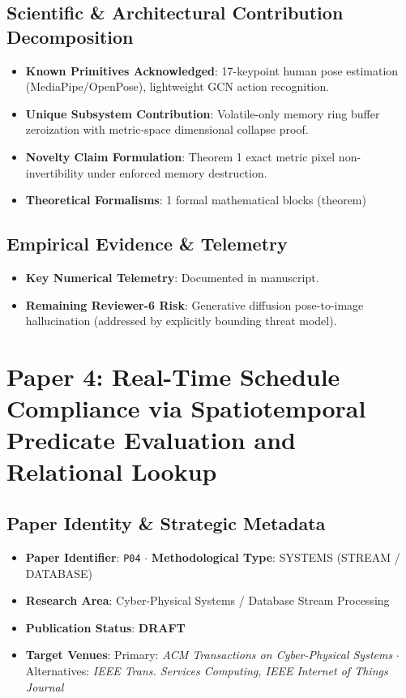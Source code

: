 \documentclass[11pt,a4paper]{article}
\begin{document}
\subsection*{Scientific & Architectural Contribution Decomposition}
\begin{itemize}[leftmargin=1.5em, itemsep=0.2em]
    \item \textbf{Known Primitives Acknowledged}: 17-keypoint human pose estimation (MediaPipe/OpenPose), lightweight GCN action recognition.
    \item \textbf{Unique Subsystem Contribution}: Volatile-only memory ring buffer zeroization with metric-space dimensional collapse proof.
    \item \textbf{Novelty Claim Formulation}: Theorem 1 exact metric pixel non-invertibility under enforced memory destruction.
    \item \textbf{Theoretical Formalisms}: 1 formal mathematical blocks (theorem)
\end{itemize}

\subsection*{Empirical Evidence & Telemetry}
\begin{itemize}[leftmargin=1.5em, itemsep=0.2em]
    \item \textbf{Key Numerical Telemetry}: Documented in manuscript.
    \item \textbf{Remaining Reviewer-6 Risk}: Generative diffusion pose-to-image hallucination (addressed by explicitly bounding threat model).
\end{itemize}

\section{Paper 4: Real-Time Schedule Compliance via Spatiotemporal Predicate Evaluation and Relational Lookup}

\subsection*{Paper Identity \& Strategic Metadata}
\begin{itemize}[leftmargin=1.5em, itemsep=0.2em]
    \item \textbf{Paper Identifier}: \texttt{P04} $\cdot$ \textbf{Methodological Type}: SYSTEMS (STREAM / DATABASE)
    \item \textbf{Research Area}: Cyber-Physical Systems / Database Stream Processing
    \item \textbf{Publication Status}: \textbf{DRAFT}
    \item \textbf{Target Venues}: Primary: \textit{ACM Transactions on Cyber-Physical Systems} $\cdot$ Alternatives: \textit{IEEE Trans. Services Computing, IEEE Internet of Things Journal}
\end{itemize}
\end{document}
